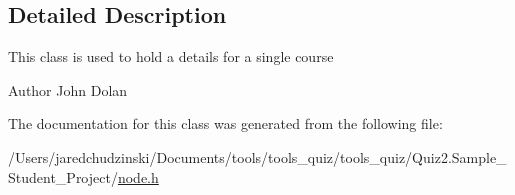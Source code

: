 \subsection{Detailed Description}
This class is used to hold a details for a single course \begin{DoxyAuthor}{Author}
John Dolan 
\end{DoxyAuthor}


The documentation for this class was generated from the following file\+:\begin{DoxyCompactItemize}
\item 
/\+Users/jaredchudzinski/\+Documents/tools/tools\+\_\+quiz/tools\+\_\+quiz/\+Quiz2.\+Sample\+\_\+\+Student\+\_\+\+Project/\mbox{\hyperlink{node_8h}{node.\+h}}\end{DoxyCompactItemize}
